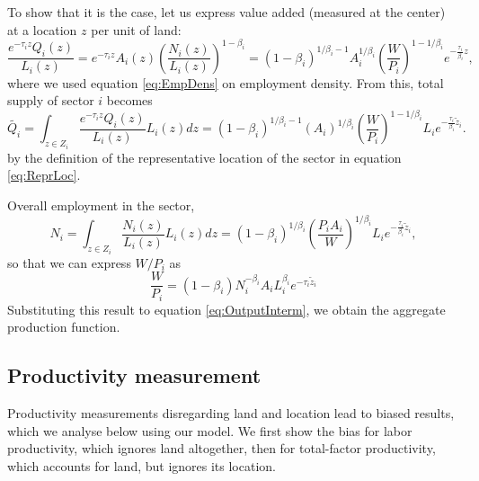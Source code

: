 \documentclass[12pt]{article}
\begin{document}
To show that it is the case, let us express value added (measured at the center) at a location $z$ per unit of land:
\[
\frac{e^{-\tau_i z} Q_i(z)}{L_i(z)} = e^{-\tau_i z} A_i(z)\left(\frac{N_i(z)}{L_i(z)}\right)^{1-\beta_i} = (1-\beta_i)^{1/\beta_i-1}
A_i^{1/\beta_i}\left(\frac{W}{P_i}\right)^{1-1/\beta_i}
 e^{-\frac{\tau_i}{\beta_i} z},
\]
where we used equation \ref{eq:EmpDens} on employment density. From this, total supply of sector $i$ becomes 
\begin{equation}
\label{eq:OutputInterm}
\tilde{Q_i} = \int_{z\in Z_i}\frac{e^{-\tau_i z} Q_i(z)}{L_i(z)}L_i(z)dz=(1-\beta_i)^{1/\beta_i-1}
(A_i)^{1/\beta_i}\left(\frac{W}{P_i}\right)^{1-1/\beta_i} L_i e^{-\frac{\tau_i}{\beta_i} \tilde z_i}.
\end{equation} 
by the definition of the representative location of the sector in equation \ref{eq:ReprLoc}.

Overall employment in the sector,
\[
N_i = \int_{z\in Z_i}\frac{N_i(z)}{L_i(z)}L_i(z)dz= (1-\beta_i)^{1/\beta_i}
\left(\frac{P_iA_i}{W}\right)^{1/\beta_i} L_i e^{-\frac{\tau_i}{\beta_i} \tilde z_i},
\]
so that we can express $W/P_i$ as
\[
\frac{W}{P_i} = (1-\beta_i)
N_i^{-\beta_i}A_i L_i^{\beta_i}
 e^{-\tau_i\tilde z_i}
\]
Substituting this result to equation \ref{eq:OutputInterm}, we obtain the aggregate production function. 

\subsection{Productivity measurement}
Productivity measurements disregarding land and location lead to biased results, which we analyse below using our model. We first show the bias for labor productivity, which ignores land altogether, then for total-factor productivity, which accounts for land, but ignores its location.

\end{document}
